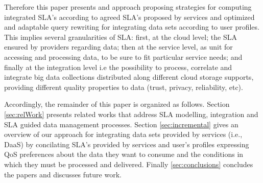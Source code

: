 Therefore this paper presents and approach proposing strategies for computing integrated SLA’s according to agreed SLA’s proposed by services and optimized and adaptable query rewriting for integrating data sets  according to user profiles.
This implies several granularities of SLA: first, at the cloud level; the SLA ensured by providers regarding data; then at the service level, as unit for accessing and processing data, to be sure to fit particular service needs; and finally at the integration level i.e the possibility to process, correlate and integrate big data collections distributed along different cloud storage supports, providing different quality properties to data (trust, privacy, reliability, etc).
 
 


Accordingly, the remainder of this paper is organized as follows. Section \ref{sec:relWork} presents related works that address SLA modelling, integration and SLA guided data management processes. Section \ref{sec:incremental} gives an overview of our approach for integrating data sets provided by services (i.e., DaaS) by concilating SLA's provided by services and user's profiles expressing QoS preferences about the data they want to consume and the conditions in which they must be processed and delivered. 
Finally \ref{sec:conclusions} concludes the papers and discusses future work.